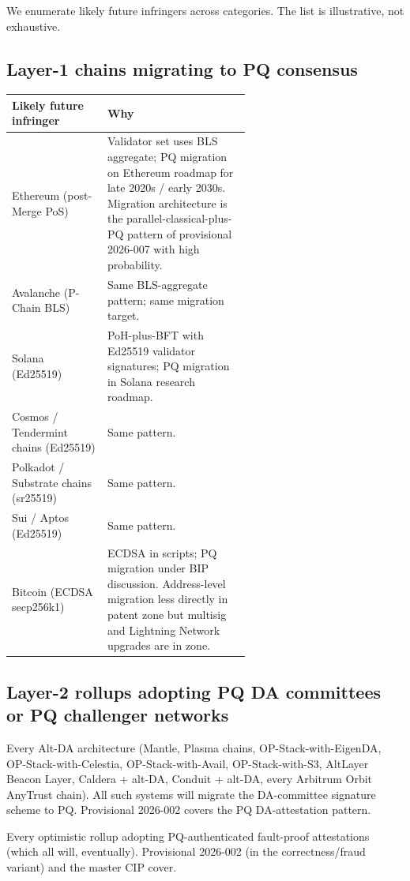 \documentclass[11pt,letterpaper]{article}
\begin{document}
We enumerate likely future infringers across categories. The list is illustrative, not exhaustive.

\subsection{Layer-1 chains migrating to PQ consensus}

\begin{longtable}{lp{0.6\linewidth}}
\toprule
\textbf{Likely future infringer} & \textbf{Why} \\
\midrule
Ethereum (post-Merge PoS) & Validator set uses BLS aggregate; PQ migration on Ethereum roadmap for late 2020s / early 2030s. Migration architecture is the parallel-classical-plus-PQ pattern of provisional 2026-007 with high probability. \\
Avalanche (P-Chain BLS) & Same BLS-aggregate pattern; same migration target. \\
Solana (Ed25519) & PoH-plus-BFT with Ed25519 validator signatures; PQ migration in Solana research roadmap. \\
Cosmos / Tendermint chains (Ed25519) & Same pattern. \\
Polkadot / Substrate chains (sr25519) & Same pattern. \\
Sui / Aptos (Ed25519) & Same pattern. \\
Bitcoin (ECDSA secp256k1) & ECDSA in scripts; PQ migration under BIP discussion. Address-level migration less directly in patent zone but multisig and Lightning Network upgrades are in zone. \\
\bottomrule
\end{longtable}

\subsection{Layer-2 rollups adopting PQ DA committees or PQ challenger networks}

Every Alt-DA architecture (Mantle, Plasma chains, OP-Stack-with-EigenDA, OP-Stack-with-Celestia, OP-Stack-with-Avail, OP-Stack-with-S3, AltLayer Beacon Layer, Caldera + alt-DA, Conduit + alt-DA, every Arbitrum Orbit AnyTrust chain). All such systems will migrate the DA-committee signature scheme to PQ. Provisional 2026-002 covers the PQ DA-attestation pattern.

Every optimistic rollup adopting PQ-authenticated fault-proof attestations (which all will, eventually). Provisional 2026-002 (in the correctness/fraud variant) and the master CIP cover.
\end{document}
